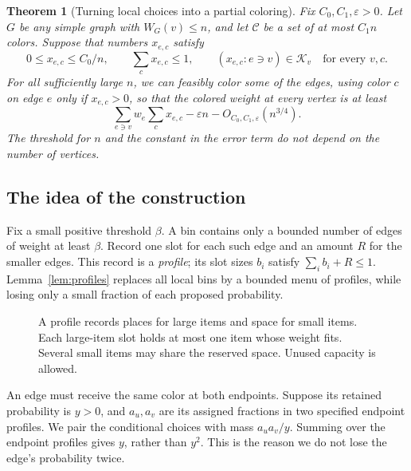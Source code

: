 \documentclass[11pt]{article}
\newtheorem{theorem}{Theorem}[section]
\theoremstyle{definition}\newtheorem{algorithm}{Algorithm}[section]
\numberwithin{equation}{section}
\theoremstyle{remark}\newtheorem*{remark}{Remark}
\newcommand{\cC}{\mathcal C}
\newcommand{\eps}{\varepsilon}
\begin{document}
\begin{theorem}[Turning local choices into a partial coloring]\label{thm:round}
Fix $C_0,C_1,\eps>0$. Let $G$ be any simple graph with
$W_G(v)\le n$, and let $\cC$ be a set of at most $C_1n$ colors.
Suppose that numbers $x_{e,c}$ satisfy
\[
 0\le x_{e,c}\le C_0/n,\qquad \sum_cx_{e,c}\le1,
 \qquad (x_{e,c}:e\ni v)\in\mathcal K_v
 \quad\text{for every }v,c.
\]
For all sufficiently large $n$, we can feasibly color some of the edges,
using color $c$ on edge $e$ only if $x_{e,c}>0$, so that the colored
weight at every vertex is at least
\[
 \sum_{e\ni v}w_e\sum_cx_{e,c}
       -\eps n-O_{C_0,C_1,\eps}(n^{3/4}).
\]
The threshold for $n$ and the constant in the error term do not depend
on the number of vertices.
\end{theorem}

\subsection*{The idea of the construction}
Fix a small positive threshold $\beta$. A bin contains only a bounded
number of edges of weight at least $\beta$. Record one slot for each
such edge and an amount $R$ for the smaller edges. This record is a
\emph{profile}; its slot sizes $b_i$ satisfy $\sum_i b_i+R\le1$.
Lemma~\ref{lem:profiles} replaces all local bins by a bounded menu of
profiles, while losing only a small fraction of each proposed probability.

\begin{figure}[htbp]
\centering
{}
\caption{A profile records places for large items and space for
small items. Each large-item slot holds at most one item whose weight
fits. Several small items may share the reserved space. Unused capacity
is allowed.}
\label{fig:bin-description}
\end{figure}
An edge must receive the same color at both endpoints. Suppose its
retained probability is $y>0$, and $a_u,a_v$ are its assigned fractions
in two specified endpoint profiles. We pair the conditional choices with
mass $a_ua_v/y$. Summing over the endpoint profiles gives $y$, rather
than $y^2$. This is the reason we do not lose the edge's probability twice.
\end{document}
